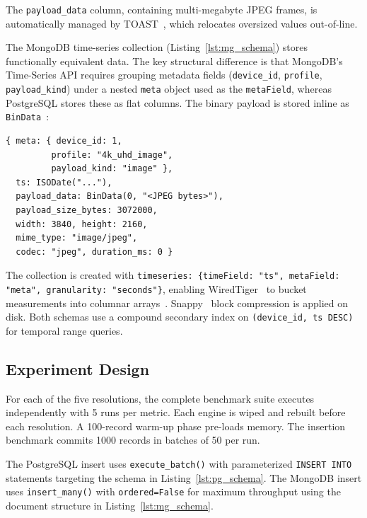 \documentclass[conference]{IEEEtran}
\begin{document}
The \texttt{payload\_data} column, containing multi-megabyte JPEG frames, is automatically managed by TOAST~\cite{postgresql_toast_docs}, which relocates oversized values out-of-line.

The MongoDB time-series collection (Listing~\ref{lst:mg_schema}) stores functionally equivalent data. The key structural difference is that MongoDB's Time-Series API requires grouping metadata fields (\texttt{device\_id}, \texttt{profile}, \texttt{payload\_kind}) under a nested \texttt{meta} object used as the \texttt{metaField}, whereas PostgreSQL stores these as flat columns. The binary payload is stored inline as \texttt{BinData}~\cite{mongodb_bson_spec}:

\begin{lstlisting}[basicstyle=\ttfamily\scriptsize,breaklines=true,caption={MongoDB document structure (per insert).},label={lst:mg_schema}]
{ meta: { device_id: 1,
         profile: "4k_uhd_image",
         payload_kind: "image" },
  ts: ISODate("..."),
  payload_data: BinData(0, "<JPEG bytes>"),
  payload_size_bytes: 3072000,
  width: 3840, height: 2160,
  mime_type: "image/jpeg",
  codec: "jpeg", duration_ms: 0 }
\end{lstlisting}

The collection is created with \texttt{timeseries: \{timeField: "ts", metaField: "meta", granularity: "seconds"\}}, enabling WiredTiger~\cite{mongodb_wiredtiger_storage} to bucket measurements into columnar arrays~\cite{mongodb_ts_best_practices}. Snappy~\cite{google_snappy} block compression is applied on disk. Both schemas use a compound secondary index on \texttt{(device\_id, ts DESC)} for temporal range queries.

\subsection{Experiment Design}
For each of the five resolutions, the complete benchmark suite executes independently with 5 runs per metric. Each engine is wiped and rebuilt before each resolution. A 100-record warm-up phase pre-loads memory. The insertion benchmark commits 1000 records in batches of 50 per run.

The PostgreSQL insert uses \texttt{execute\_batch()} with parameterized \texttt{INSERT INTO} statements targeting the schema in Listing~\ref{lst:pg_schema}. The MongoDB insert uses \texttt{insert\_many()} with \texttt{ordered=False} for maximum throughput using the document structure in Listing~\ref{lst:mg_schema}.
\end{document}
